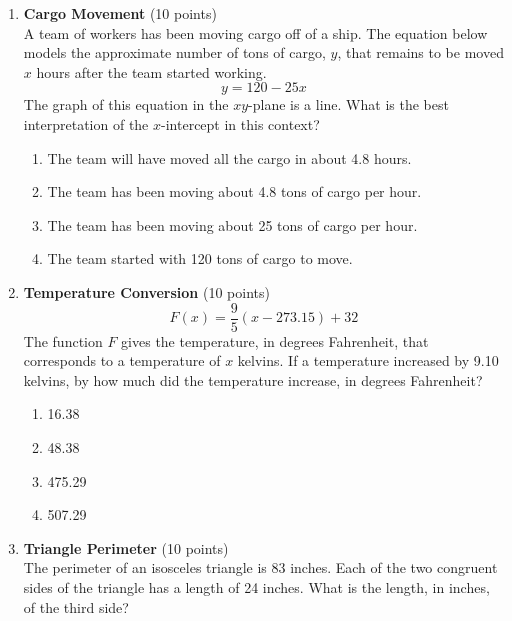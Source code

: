 \begin{enumerate}
  \newpage

  \item \textbf{Cargo Movement} (10 points)\\
  A team of workers has been moving cargo off of a ship. The equation below models the approximate number of tons of cargo, $y$, that remains to be moved $x$ hours after the team started working.
  \[y=120-25x\]
  The graph of this equation in the $xy$-plane is a line. What is the best interpretation of the $x$-intercept in this context?\\
  \begin{enumerate}[label=(\Alph*)]
    \item The team will have moved all the cargo in about 4.8 hours.
    \item The team has been moving about 4.8 tons of cargo per hour.
    \item The team has been moving about 25 tons of cargo per hour.
    \item The team started with 120 tons of cargo to move.
  \end{enumerate}
  \begin{subanswer}
  \end{subanswer}

  \newpage

  \item \textbf{Temperature Conversion} (10 points)\\
  \[F(x)=\frac{9}{5}(x-273.15)+32\]
  The function $F$ gives the temperature, in degrees Fahrenheit, that corresponds to a temperature of $x$ kelvins. If a temperature increased by 9.10 kelvins, by how much did the temperature increase, in degrees Fahrenheit?\\
  \begin{enumerate}[label=(\Alph*)]
    \item 16.38
    \item 48.38
    \item 475.29
    \item 507.29
  \end{enumerate}
  \begin{subanswer}
  \end{subanswer}

  \item \textbf{Triangle Perimeter} (10 points)\\
  The perimeter of an isosceles triangle is 83 inches. Each of the two congruent sides of the triangle has a length of 24 inches. What is the length, in inches, of the third side?
  \begin{subanswer}
  \end{subanswer}


\end{enumerate}
